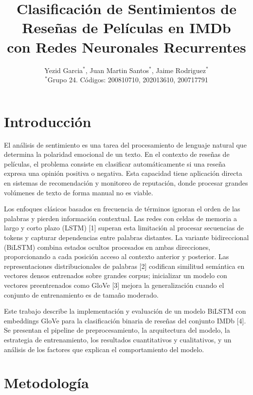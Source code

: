 \documentclass[letterpaper, 10pt, conference]{ieeeconf}
\title{\LARGE \bf
Clasificaci\'on de Sentimientos de Rese\~nas de Pel\'iculas en IMDb\\
con Redes Neuronales Recurrentes
}
\author{
  Yezid Garcia$^{*}$, Juan Martin Santos$^{*}$, Jaime Rodriguez$^{*}$ \\
  $^{*}$Grupo 24. C\'odigos: 200810710, 202013610, 200717791
}
\begin{document}
\maketitle
\thispagestyle{empty}
\pagestyle{empty}

\section{Introducci\'on}

El an\'alisis de sentimiento es una tarea del procesamiento de lenguaje natural
que determina la polaridad emocional de un texto. En el contexto de rese\~nas
de pel\'iculas, el problema consiste en clasificar autom\'aticamente si una
rese\~na expresa una opini\'on positiva o negativa. Esta capacidad tiene
aplicaci\'on directa en sistemas de recomendaci\'on y monitoreo de reputaci\'on,
donde procesar grandes vol\'umenes de texto de forma manual no es viable.

Los enfoques cl\'asicos basados en frecuencia de t\'erminos ignoran el orden
de las palabras y pierden informaci\'on contextual. Las redes con celdas de
memoria a largo y corto plazo (LSTM) [1] superan esta limitaci\'on al procesar
secuencias de tokens y capturar dependencias entre palabras distantes. La
variante bidireccional (BiLSTM) combina estados ocultos procesados en ambas
direcciones, proporcionando a cada posici\'on acceso al contexto anterior y
posterior. Las representaciones distribucionales de palabras [2] codifican
similitud sem\'antica en vectores densos entrenados sobre grandes corpus;
inicializar un modelo con vectores preentrenados como GloVe [3] mejora la
generalizaci\'on cuando el conjunto de entrenamiento es de tama\~no moderado.

Este trabajo describe la implementaci\'on y evaluaci\'on de un modelo BiLSTM
con embeddings GloVe para la clasificaci\'on binaria de rese\~nas del conjunto
IMDb [4]. Se presentan el pipeline de preprocesamiento, la arquitectura del
modelo, la estrategia de entrenamiento, los resultados cuantitativos y
cualitativos, y un an\'alisis de los factores que explican el comportamiento
del modelo.

\section{Metodolog\'ia}
\end{document}
